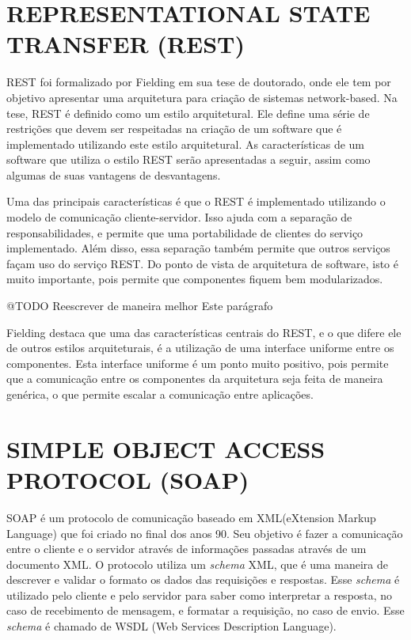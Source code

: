 \section{REPRESENTATIONAL STATE TRANSFER (REST)}
REST foi formalizado por Fielding \cite{fielding} em sua tese de doutorado, onde ele tem por 
objetivo apresentar uma arquitetura para criação de sistemas network-based. 
Na tese, REST é definido como um estilo arquitetural. Ele define uma série de restrições que devem ser 
respeitadas na criação de um software que é implementado utilizando este estilo arquitetural. 
As características de um software que utiliza o estilo REST serão apresentadas a seguir, assim 
como algumas de suas vantagens de desvantagens.

Uma das principais características é que o REST é implementado utilizando o modelo de comunicação 
cliente-servidor. Isso ajuda com a separação de responsabilidades, e permite que uma portabilidade 
de clientes do serviço implementado. Além disso, essa separação também permite que outros serviços 
façam uso do serviço REST. Do ponto de vista de arquitetura de software, isto é muito importante, 
pois permite que componentes fiquem bem modularizados.

@TODO Reescrever de maneira melhor Este parágrafo

Fielding \cite{fielding} destaca que uma das características centrais do REST, e o que difere ele 
de outros estilos arquiteturais, é a utilização de uma interface uniforme entre os componentes. 
Esta interface uniforme é um ponto muito positivo, pois permite que a comunicação entre os 
componentes da arquitetura seja feita de maneira genérica, o que permite escalar a comunicação 
entre aplicações.

\section{SIMPLE OBJECT ACCESS PROTOCOL (SOAP)}
SOAP é um protocolo de comunicação baseado em XML(eXtension Markup Language) que foi criado no final 
dos anos 90. Seu objetivo é fazer a comunicação entre o cliente e o servidor através de informações 
passadas através de um documento XML. O protocolo utiliza um \textit{schema} XML, que é uma 
maneira de descrever e validar o formato os dados das requisições e respostas. 
Esse \textit{schema} é utilizado pelo cliente e pelo servidor para saber como interpretar 
a resposta, no caso de recebimento de mensagem, e formatar a requisição, no caso de envio.
Esse \textit{schema} é chamado de WSDL (Web Services Description Language).

